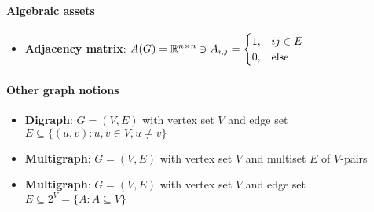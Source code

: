 \paragraph{Algebraic assets}
\begin{itemize}
  \item \textbf{Adjacency matrix}: $ A(G) = \mathbb{R}^{n \times n} \ni A_{i,j} = \begin{cases}
    1, & ij \in E \\
    0, & \text{else}
  \end{cases} $
\end{itemize}

\paragraph{Other graph notions}
\begin{itemize}
  \item \textbf{Digraph}: $ G = (V,E) $ with vertex set $ V $ and edge set $ E \subseteq \{ (u,v) : u,v \in V, u \neq v \} $
  \item \textbf{Multigraph}: $ G = (V,E) $ with vertex set $ V $ and multiset $ E $ of $ V $-pairs
  \item \textbf{Multigraph}: $ G = (V,E) $ with vertex set $ V $ and edge set $ E \subseteq 2^V = \{ A : A \subseteq V \} $
\end{itemize}


